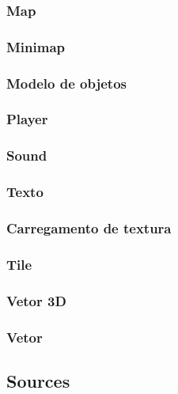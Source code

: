 \subsubsection{Map}

\subsubsection{Minimap}

\subsubsection{Modelo de objetos}

\subsubsection{Player}

\subsubsection{Sound}

\subsubsection{Texto}

\subsubsection{Carregamento de textura}

\subsubsection{Tile}

\subsubsection{Vetor 3D}

\subsubsection{Vetor}


\subsection{Sources}\label{.cpp}

